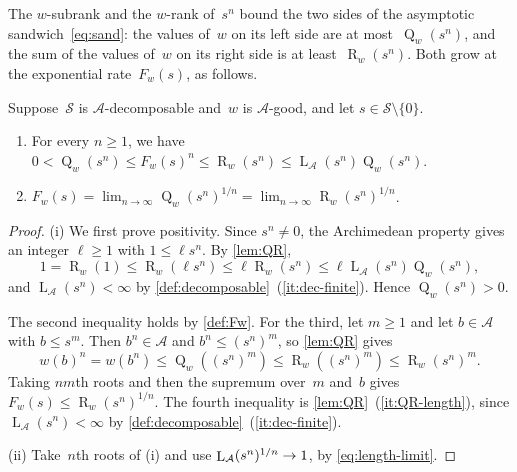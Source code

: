 \documentclass[11pt,letterpaper]{article}
\DeclareMathOperator{\subrank}{Q}
\DeclareMathOperator{\declength}{L}
\DeclareMathOperator{\tensorrank}{R}
\begin{document}
The $w$-subrank and the $w$-rank of~$s^n$ bound the two sides of the asymptotic sandwich~\eqref{eq:sand}: the values of~$w$ on its left side are at most~$\subrank_w(s^n)$, and the sum of the values of~$w$ on its right side is at least~$\tensorrank_w(s^n)$. Both grow at the exponential rate~$F_w(s)$, as follows.

\begin{lemma}\label{lem:MZ}
Suppose~$\mathcal{S}$ is $\mathcal{A}$-decomposable and~$w$ is $\mathcal{A}$-good, and let $s \in \mathcal{S} \setminus \{0\}$.
\begin{enumerate}[\upshape(i)]
\item\label{it:MZ-bounds} For every $n \geq 1$, we have $0 < \subrank_w(s^n) \leq F_w(s)^n \leq \tensorrank_w(s^n) \leq \declength_{\mathcal{A}}(s^n) \subrank_w(s^n)$.
\item\label{it:MZ-limit} $F_w(s) = \lim_{n\to\infty} \subrank_w(s^n)^{1/n} = \lim_{n\to\infty} \tensorrank_w(s^n)^{1/n}$.
\end{enumerate}
\end{lemma}
\begin{proof}
(i) We first prove positivity. Since $s^n \neq 0$, the Archimedean property gives an integer $\ell \geq 1$ with $1 \leq \ell s^n$. By \cref{lem:QR},
\[
1 = \tensorrank_w(1) \leq \tensorrank_w(\ell s^n) \leq \ell \tensorrank_w(s^n) \leq \ell \declength_{\mathcal{A}}(s^n) \subrank_w(s^n),
\]
and $\declength_{\mathcal{A}}(s^n) < \infty$ by \cref{def:decomposable}~(\ref{it:dec-finite}). Hence $\subrank_w(s^n) > 0$.

The second inequality holds by \cref{def:Fw}. For the third, let $m \geq 1$ and let $b \in \mathcal{A}$ with $b \leq s^m$. Then $b^n \in \mathcal{A}$ and $b^n \leq (s^n)^m$, so \cref{lem:QR} gives
\[
w(b)^n = w(b^n) \leq \subrank_w((s^n)^m) \leq \tensorrank_w((s^n)^m) \leq \tensorrank_w(s^n)^m.
\]
Taking $nm$th roots and then the supremum over~$m$ and~$b$ gives $F_w(s) \leq \tensorrank_w(s^n)^{1/n}$. The fourth inequality is \cref{lem:QR}~(\ref{it:QR-length}), since $\declength_{\mathcal{A}}(s^n) < \infty$ by \cref{def:decomposable}~(\ref{it:dec-finite}).

(ii) Take~$n$th roots of (i) and use $\declength_{\mathcal{A}}(s^n)^{\smash{1/n}} \to 1$, by \eqref{eq:length-limit}.
\end{proof}
\end{document}
